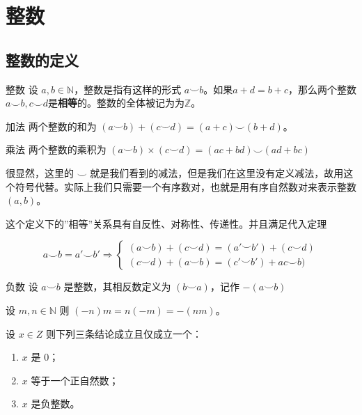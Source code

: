 \section{整数}

\subsection{整数的定义}

\begin{definition}{整数}{}
	设 $a,b\in \mathbb N$，整数是指有这样的形式 $a\smile b$。如果$a+d=b+c$，那么两个整数$a\smile b, c\smile d$是\textbf{相等}的。整数的全体被记为为$\mathbb Z$。
\end{definition}

\begin{definition}{加法}{}
	两个整数的和为 $(a\smile b) + (c\smile d) = (a+c)\smile (b+d)$。
\end{definition}

\begin{definition}{乘法}{}
	两个整数的乘积为 $(a\smile b) \times (c\smile d) = (ac+bd)\smile(ad+bc)$
\end{definition}

\begin{note}
	很显然，这里的 $\smile$ 就是我们看到的减法，但是我们在这里没有定义减法，故用这个符号代替。实际上我们只需要一个有序数对，也就是用有序自然数对来表示整数$(a,b)$。
\end{note}

\begin{note} 
	这个定义下的''相等''关系具有自反性、对称性、传递性。并且满足代入定理
\end{note}

$$
a\smile b = a'\smile b' \Rightarrow 
\begin{cases}
	(a\smile b) + (c\smile d) = (a'\smile b') + (c\smile d)\\
	(c\smile d) + (a\smile b) = (c'\smile b') + ac\smile b)
\end{cases}
$$

\begin{definition}{负数}{}
	设 $a\smile b$ 是整数，其相反数定义为 $(b\smile a)$，记作 $-(a\smile b)$
\end{definition}

\begin{corollary}{}{}
	设 $m,n\in \mathbb N$ 则 $(-n)m = n(-m) = -(nm)$。
\end{corollary}

\begin{lemma}{}{}
	设 $x\in Z$ 则下列三条结论成立且仅成立一个：
	\begin{enumerate}
		\item $x$ 是 0；
		\item $x$ 等于一个正自然数；
		\item $x$ 是负整数。
	\end{enumerate}
\end{lemma}

